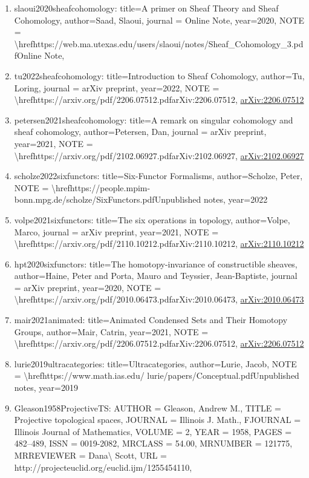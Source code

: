 \documentclass[11pt]{article}
\begin{document}
\begin{enumerate}[leftmargin=*]
  \item slaoui2020sheafcohomology: title=A primer on Sheaf Theory and Sheaf Cohomology, author=Saad, Slaoui, journal = Online Note, year=2020, NOTE = \textbackslash{}hrefhttps://web.ma.utexas.edu/users/slaoui/notes/Sheaf\_Cohomology\_3.pdfOnline Note,
  \item tu2022sheafcohomology: title=Introduction to Sheaf Cohomology, author=Tu, Loring, journal = arXiv preprint, year=2022, NOTE = \textbackslash{}hrefhttps://arxiv.org/pdf/2206.07512.pdfarXiv:2206.07512, \href{https://arxiv.org/abs/2206.07512}{arXiv:2206.07512}
  \item petersen2021sheafcohomology: title=A remark on singular cohomology and sheaf cohomology, author=Petersen, Dan, journal = arXiv preprint, year=2021, NOTE = \textbackslash{}hrefhttps://arxiv.org/pdf/2102.06927.pdfarXiv:2102.06927, \href{https://arxiv.org/abs/2102.06927}{arXiv:2102.06927}
  \item scholze2022sixfunctors: title=Six-Functor Formalisms, author=Scholze, Peter, NOTE = \textbackslash{}hrefhttps://people.mpim-bonn.mpg.de/scholze/SixFunctors.pdfUnpublished notes, year=2022
  \item volpe2021sixfunctors: title=The six operations in topology, author=Volpe, Marco, journal = arXiv preprint, year=2021, NOTE = \textbackslash{}hrefhttps://arxiv.org/pdf/2110.10212.pdfarXiv:2110.10212, \href{https://arxiv.org/abs/2110.10212}{arXiv:2110.10212}
  \item hpt2020sixfunctors: title=The homotopy-invariance of constructible sheaves, author=Haine, Peter and Porta, Mauro and Teyssier, Jean-Baptiste, journal = arXiv preprint, year=2020, NOTE = \textbackslash{}hrefhttps://arxiv.org/pdf/2010.06473.pdfarXiv:2010.06473, \href{https://arxiv.org/abs/2010.06473}{arXiv:2010.06473}
  \item mair2021animated: title=Animated Condensed Sets and Their Homotopy Groups, author=Mair, Catrin, year=2021, NOTE = \textbackslash{}hrefhttps://arxiv.org/pdf/2206.07512.pdfarXiv:2206.07512, \href{https://arxiv.org/abs/2206.07512}{arXiv:2206.07512}
  \item lurie2019ultracategories: title=Ultracategories, author=Lurie, Jacob, NOTE = \textbackslash{}hrefhttps://www.math.ias.edu/ lurie/papers/Conceptual.pdfUnpublished notes, year=2019
  \item Gleason1958ProjectiveTS: AUTHOR = Gleason, Andrew M., TITLE = Projective topological spaces, JOURNAL = Illinois J. Math., FJOURNAL = Illinois Journal of Mathematics, VOLUME = 2, YEAR = 1958, PAGES = 482--489, ISSN = 0019-2082, MRCLASS = 54.00, MRNUMBER = 121775, MRREVIEWER = Dana\textbackslash{} Scott, URL = http://projecteuclid.org/euclid.ijm/1255454110,

\end{enumerate}
\end{document}
